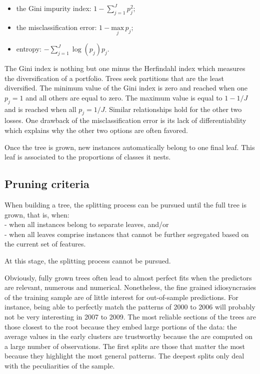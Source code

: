 \documentclass[]{krantz}
\providecommand{\tightlist}{%
  \setlength{\itemsep}{0pt}\setlength{\parskip}{0pt}}
\theoremstyle{definition}
\theoremstyle{definition}
\theoremstyle{definition}
\theoremstyle{remark}
\begin{document}
\begin{itemize}
\tightlist
\item
  the Gini impurity index: \(1-\sum_{j=1}^Jp_j^2;\)\\
\item
  the misclassification error: \(1-\underset{j}{\text{max}}\, p_j;\)\\
\item
  entropy: \(-\sum_{j=1}^J\log(p_j)p_j.\)
\end{itemize}

The Gini index is nothing but one minus the Herfindahl index which
measures the diversification of a portfolio. Trees seek partitions that
are the least diversified. The minimum value of the Gini index is zero
and reached when one \(p_j=1\) and all others are equal to zero. The
maximum value is equal to \(1-1/J\) and is reached when all \(p_j=1/J\).
Similar relationships hold for the other two losses. One drawback of the
misclassification error is its lack of differentiability which explains
why the other two options are often favored.

Once the tree is grown, new instances automatically belong to one final
leaf. This leaf is associated to the proportions of classes it nests.

\hypertarget{pruning-criteria}{%
\subsection{Pruning criteria}\label{pruning-criteria}}

When building a tree, the splitting process can be pursued until the
full tree is grown, that is, when:\\
- when all instances belong to separate leaves, and/or\\
- when all leaves comprise instances that cannot be further segregated
based on the current set of features.

At this stage, the splitting process cannot be pursued.

Obviously, fully grown trees often lead to almost perfect fits when the
predictors are relevant, numerous and numerical. Nonetheless, the fine
grained idiosyncrasies of the training sample are of little interest for
out-of-sample predictions. For instance, being able to perfectly match
the patterns of 2000 to 2006 will probably not be very interesting in
2007 to 2009. The most reliable sections of the trees are those closest
to the root because they embed large portions of the data: the average
values in the early clusters are trustworthy because the are computed on
a large number of observations. The first splits are those that matter
the most because they highlight the most general patterns. The deepest
splits only deal with the peculiarities of the sample.
\end{document}
